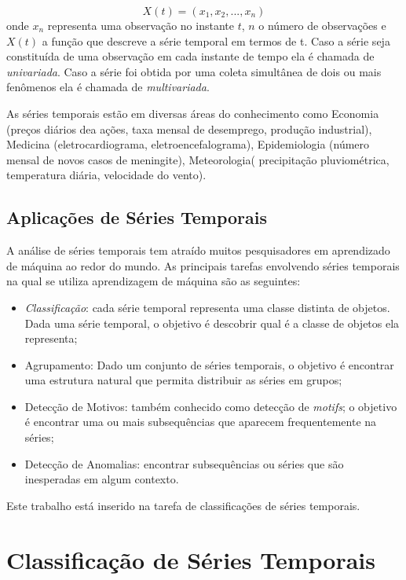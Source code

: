 \begin{equation} \label{eq_TS}
X(t) = (x_1,x_2,...,x_n)
\end{equation}
onde $x_n$ representa uma observação no instante $t$, $n$ o número de observações e $X(t)$ a função que descreve a série temporal em termos de t. Caso a série seja constituída de uma observação em cada instante de tempo ela é chamada de \textit{univariada}. Caso a série foi obtida por uma coleta simultânea de dois ou mais fenômenos ela é chamada de \textit{multivariada}.

As séries temporais estão em diversas áreas do conhecimento como Economia (preços diários dea ações, taxa mensal de desemprego, produção industrial), Medicina (eletrocardiograma, eletroencefalograma), Epidemiologia (número mensal de novos casos de meningite), Meteorologia( precipitação pluviométrica, temperatura diária, velocidade do vento).

\subsection{Aplicações de Séries Temporais}
A análise de séries temporais tem atraído muitos pesquisadores em aprendizado de máquina ao redor do mundo. As principais tarefas envolvendo séries temporais na qual se utiliza aprendizagem de máquina são as seguintes:

\begin{itemize}
	\item \textit{Classificação}: cada série temporal representa uma classe distinta de objetos. Dada uma série temporal, o objetivo é descobrir qual é a classe de objetos ela representa; 
	\item Agrupamento: Dado um conjunto de séries temporais, o objetivo é encontrar uma estrutura natural que permita distribuir as séries em grupos; 
	\item Detecção de Motivos: também conhecido como detecção de \textit{motifs}; o objetivo é encontrar uma ou mais subsequências que aparecem frequentemente na séries;
	\item Detecção de Anomalias: encontrar subsequências ou séries que são inesperadas em algum contexto.
\end{itemize}
Este trabalho está inserido na tarefa de classificações de séries temporais.
\section{Classificação de Séries Temporais}



